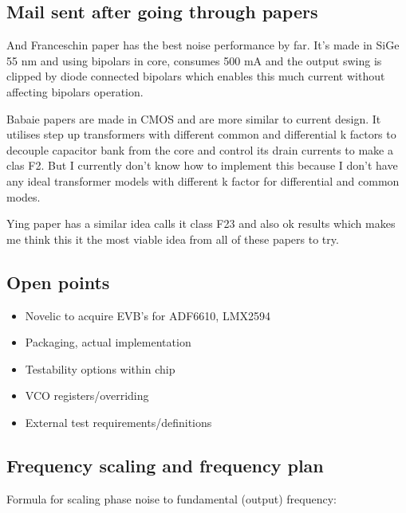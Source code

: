 \documentclass{article}
\begin{document}
\subsection{Mail sent after going through papers}


And Franceschin paper has the best noise performance by far. It's made in SiGe 55 nm and using bipolars in core, consumes 500 mA and the output swing is clipped by diode connected bipolars which enables this much current without affecting bipolars operation.

Babaie papers are made in CMOS and are more similar to current design. It utilises step up transformers with different common and differential k factors to decouple capacitor bank from the core and control its drain currents to make a clas F2. But I currently don't know how to implement this because I don't have any ideal transformer models with different k factor for differential and common modes.

Ying paper has a similar idea calls it class F23 and also ok results which makes me think this it the most viable idea from all of these papers to try.


\subsection{Open points}

\begin{itemize}
	\item Novelic to acquire EVB's for ADF6610, LMX2594 %
	\item Packaging, actual implementation
	\item Testability options within chip
	\item VCO registers/overriding
	\item External test requirements/definitions
\end{itemize}

\subsection{Frequency scaling and frequency plan}

Formula for scaling phase noise to fundamental (output) frequency:
\end{document}
